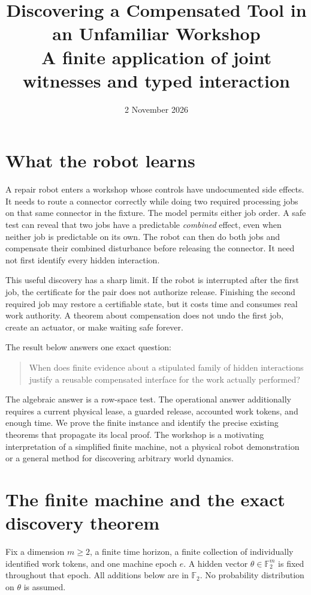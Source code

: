 \documentclass[11pt,a4paper]{article}
\title{Discovering a Compensated Tool in an Unfamiliar Workshop\\[5pt]
\large A finite application of joint witnesses and typed interaction}
\date{2 November 2026}
\theoremstyle{definition}
\newcommand{\F}{\mathbb F_2}
\begin{document}
\maketitle

\section{What the robot learns}

A repair robot enters a workshop whose controls have undocumented side
effects. It needs to route a connector correctly while doing two required processing jobs on that same
connector in the fixture. The model permits either job order. A safe test can reveal that two jobs have a predictable \emph{combined}
effect, even when neither job is predictable on its own. The robot can then
do both jobs and compensate their combined disturbance before releasing the
connector. It need not first identify every hidden interaction.

This useful discovery has a sharp limit. If the robot is interrupted after
the first job, the certificate for the pair does not authorize release.
Finishing the second required job may restore a certifiable state, but it
costs time and consumes real work authority. A theorem about compensation
does not undo the first job, create an actuator, or make waiting safe
forever.

The result below answers one exact question:
\begin{quote}
When does finite evidence about a stipulated family of hidden interactions
justify a reusable compensated interface for the work actually performed?
\end{quote}
The algebraic answer is a row-space test. The operational answer additionally
requires a current physical lease, a guarded release, accounted work tokens,
and enough time. We prove the finite instance and identify the precise
existing theorems that propagate its local proof. The workshop is a motivating
interpretation of a simplified finite machine, not a physical robot
demonstration or a general method for discovering arbitrary world dynamics.


\section{The finite machine and the exact discovery theorem}
\label{sec:model}

Fix a dimension $m\ge2$, a finite time horizon, a finite collection of
individually identified work tokens, and one machine epoch $e$. A hidden
vector $\theta\in\F^m$ is fixed throughout that epoch. All additions below
are in $\F$. No probability distribution on $\theta$ is assumed.
\end{document}
